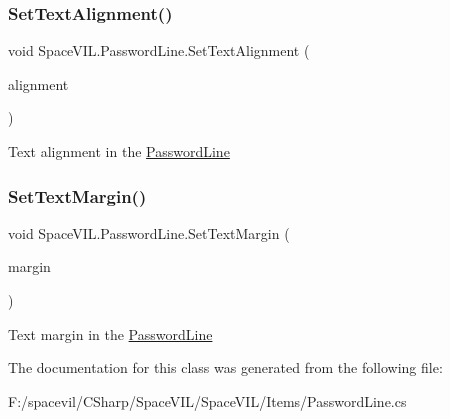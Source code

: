 \mbox{\label{class_space_v_i_l_1_1_password_line_a578351e7e63ba70e457e2779fb692c6f}} 
\subsubsection{\texorpdfstring{Set\+Text\+Alignment()}{SetTextAlignment()}}
{\footnotesize\ttfamily void Space\+V\+I\+L.\+Password\+Line.\+Set\+Text\+Alignment (\begin{DoxyParamCaption}\item[{Item\+Alignment}]{alignment }\end{DoxyParamCaption})\hspace{0.3cm}{\ttfamily [inline]}}



Text alignment in the \mbox{\hyperlink{class_space_v_i_l_1_1_password_line}{Password\+Line}} 

\mbox{\label{class_space_v_i_l_1_1_password_line_affd2b37e2f8bc81d1633b629bae29dfd}} 
\subsubsection{\texorpdfstring{Set\+Text\+Margin()}{SetTextMargin()}}
{\footnotesize\ttfamily void Space\+V\+I\+L.\+Password\+Line.\+Set\+Text\+Margin (\begin{DoxyParamCaption}\item[{\mbox{\hyperlink{struct_space_v_i_l_1_1_decorations_1_1_indents}{Indents}}}]{margin }\end{DoxyParamCaption})\hspace{0.3cm}{\ttfamily [inline]}}



Text margin in the \mbox{\hyperlink{class_space_v_i_l_1_1_password_line}{Password\+Line}} 



The documentation for this class was generated from the following file\+:\begin{DoxyCompactItemize}
\item 
F\+:/spacevil/\+C\+Sharp/\+Space\+V\+I\+L/\+Space\+V\+I\+L/\+Items/Password\+Line.\+cs\end{DoxyCompactItemize}
